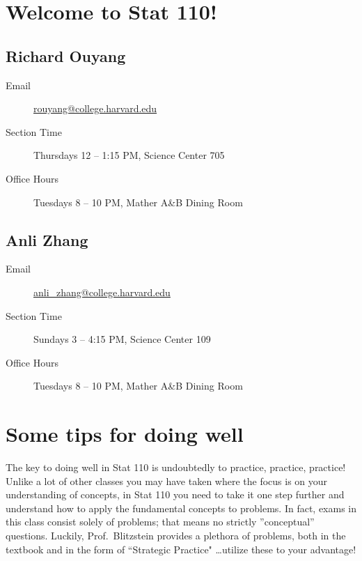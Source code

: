 \documentclass{article}
\begin{document}
\header

\section{Welcome to Stat 110!}

\subsection{Richard Ouyang}

\begin{description}

\item[Email] \url{rouyang@college.harvard.edu}

\item[Section Time] Thursdays 12 -- 1:15 PM, Science Center 705

\item[Office Hours] Tuesdays 8 -- 10 PM, Mather A\&B Dining Room

\end{description}

\subsection{Anli Zhang}

\begin{description}

\item[Email] \url{anli_zhang@college.harvard.edu}

\item[Section Time] Sundays 3 -- 4:15 PM, Science Center 109

\item[Office Hours] Tuesdays 8 -- 10 PM, Mather A\&B Dining Room

\end{description}

\section{Some tips for doing well}

The key to doing well in Stat 110 is undoubtedly to practice, practice, practice! Unlike a lot of other classes you may have taken where the focus is on your understanding of concepts, in Stat 110 you need to take it one step further and understand how to apply the fundamental concepts to problems. In fact, exams in
this class consist solely of problems; that means no strictly ”conceptual” questions. Luckily, Prof.~Blitzstein provides a plethora of problems, both in the textbook and in the form of ``Strategic Practice" \dots utilize these to your advantage!
\end{document}
